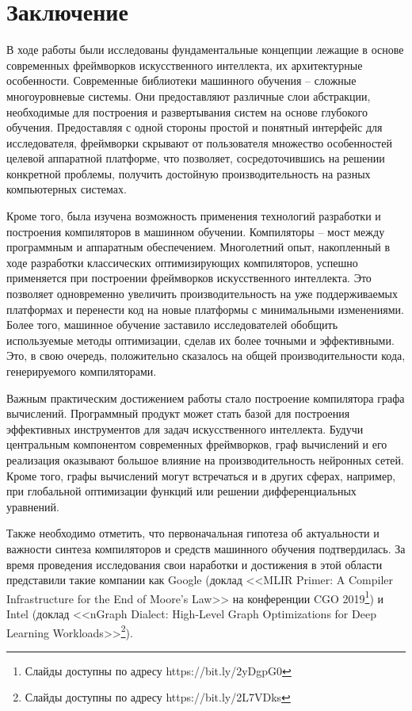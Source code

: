 \clearpage
\section{Заключение}

В ходе работы были исследованы фундаментальные концепции лежащие в основе
современных фреймворков искусственного интеллекта, их архитектурные особенности.
Современные библиотеки машинного обучения -- сложные многоуровневые системы.
Они предоставляют различные слои абстракции, необходимые для построения и
развертывания систем на основе глубокого обучения. Предоставляя с одной стороны
простой и понятный интерфейс для исследователя, фреймворки скрывают от пользователя
множество особенностей целевой аппаратной платформе, что позволяет, сосредоточившись
на решении конкретной проблемы, получить достойную производительность на разных
компьютерных системах.

Кроме того, была изучена возможность применения технологий разработки и
построения компиляторов в машинном обучении. Компиляторы -- мост между
программным и аппаратным обеспечением. Многолетний опыт, накопленный в ходе
разработки классических оптимизирующих компиляторов, успешно применяется при
построении фреймворков искусственного интеллекта. Это позволяет одновременно
увеличить производительность на уже поддерживаемых платформах и перенести код
на новые платформы с минимальными изменениями. Более того, машинное обучение
заставило исследователей обобщить используемые методы оптимизации, сделав
их более точными и эффективными. Это, в свою очередь, положительно сказалось
на общей производительности кода, генерируемого компиляторами.

Важным практическим достижением работы стало построение компилятора графа
вычислений. Программный продукт может стать базой для построения эффективных
инструментов для задач искусственного интеллекта. Будучи центральным компонентом
современных фреймворков, граф вычислений и его реализация оказывают большое
влияние на производительность нейронных сетей. Кроме того, графы вычислений
могут встречаться и в других сферах, например, при глобальной оптимизации функций
или решении дифференциальных уравнений.

Также необходимо отметить, что первоначальная гипотеза об актуальности и важности
синтеза компиляторов и средств машинного обучения подтвердилась. За время
проведения исследования свои наработки и достижения в этой области представили
такие компании как Google (доклад <<MLIR Primer: A Compiler Infrastructure for 
the End of Moore’s Law>> на конференции CGO 2019\footnote{Слайды доступны по 
адресу https://bit.ly/2yDgpG0}) и Intel (доклад <<nGraph Dialect: High-Level 
Graph Optimizations for Deep Learning Workloads>>\footnote{Слайды доступны по 
адресу https://bit.ly/2L7VDks}).

